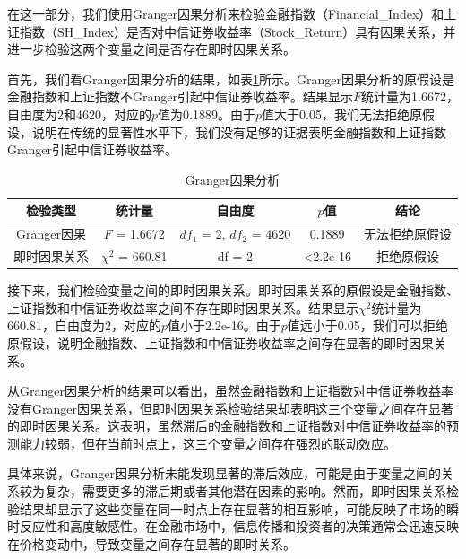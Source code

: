 \documentclass[12pt]{article}
\begin{document}
在这一部分，我们使用Granger因果分析来检验金融指数（Financial\_Index）和上证指数（SH\_Index）是否对中信证券收益率（Stock\_Return）具有因果关系，并进一步检验这两个变量之间是否存在即时因果关系。

首先，我们看Granger因果分析的结果，如表\ref{tab:Granger}所示。Granger因果分析的原假设是金融指数和上证指数不Granger引起中信证券收益率。结果显示$F$统计量为1.6672，自由度为2和4620，对应的$p$值为0.1889。由于$p$值大于0.05，我们无法拒绝原假设，说明在传统的显著性水平下，我们没有足够的证据表明金融指数和上证指数Granger引起中信证券收益率。

\begin{table}[H]
    \centering
    \caption{Granger因果分析}
    \label{tab:Granger}
    \begin{tabular}{ccccc}
        \toprule
       检验类型 & 统计量 & 自由度 & $p$值 & 结论\\
        \midrule
Granger因果 & $F$ = 1.6672 & $df_1$ = 2, $df_2$ = 4620 & 0.1889 & 无法拒绝原假设 \\
即时因果关系 & $\chi^2$ = 660.81 & df = 2 & \textless 2.2e-16 & 拒绝原假设 \\
        \bottomrule
    \end{tabular}
\end{table}


接下来，我们检验变量之间的即时因果关系。即时因果关系的原假设是金融指数、上证指数和中信证券收益率之间不存在即时因果关系。结果显示$\chi^2$统计量为660.81，自由度为2，对应的$p$值小于2.2e-16。由于$p$值远小于0.05，我们可以拒绝原假设，说明金融指数、上证指数和中信证券收益率之间存在显著的即时因果关系。

从Granger因果分析的结果可以看出，虽然金融指数和上证指数对中信证券收益率没有Granger因果关系，但即时因果关系检验结果却表明这三个变量之间存在显著的即时因果关系。这表明，虽然滞后的金融指数和上证指数对中信证券收益率的预测能力较弱，但在当前时点上，这三个变量之间存在强烈的联动效应。

具体来说，Granger因果分析未能发现显著的滞后效应，可能是由于变量之间的关系较为复杂，需要更多的滞后期或者其他潜在因素的影响。然而，即时因果关系检验结果却显示了这些变量在同一时点上存在显著的相互影响，可能反映了市场的瞬时反应性和高度敏感性。在金融市场中，信息传播和投资者的决策通常会迅速反映在价格变动中，导致变量之间存在显著的即时关系。
\end{document}
